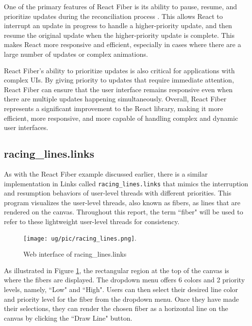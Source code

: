 \documentclass[logo,bsc,singlespacing,parskip]{infthesis}
\begin{document}
One of the primary features of React Fiber is its ability to pause, resume, and prioritize updates during the reconciliation process \cite{fiber_detail}. This allows React to interrupt an update in progress to handle a higher-priority update, and then resume the original update when the higher-priority update is complete. This makes React more responsive and efficient, especially in cases where there are a large number of updates or complex animations.

React Fiber's ability to prioritize updates is also critical for applications with complex UIs. By giving priority to updates that require immediate attention, React Fiber can ensure that the user interface remains responsive even when there are multiple updates happening simultaneously. Overall, React Fiber represents a significant improvement to the React library, making it more efficient, more responsive, and more capable of handling complex and dynamic user interfaces.

\subsection{racing\_lines.links}
\label{section:racing_lines}

As with the React Fiber example discussed earlier, there is a similar implementation in Links called \texttt{racing\_lines.links} \cite{racinglines} that mimics the interruption and resumption behaviors of user-level threads with different priorities. This program visualizes the user-level threads, also known as fibers, as lines that are rendered on the canvas. Throughout this report, the term ``fiber" will be used to refer to these lightweight user-level threads for consistency. 

\begin{figure}[htbp]
    \centering
    \texttt{[image: ug/pic/racing\_lines.png]}.
    \caption{Web interface of racing\_lines.links}
    \label{fig:racing_lines}
\end{figure} 

As illustrated in Figure \ref{fig:racing_lines}, the rectangular region at the top of the canvas is where the fibers are displayed. The dropdown menu offers 6 colors and 2 priority levels, namely, ``Low" and ``High". Users can then select their desired line color and priority level for the fiber from the dropdown menu. Once they have made their selections, they can render the chosen fiber as a horizontal line on the canvas by clicking the ``Draw Line" button.
\end{document}
